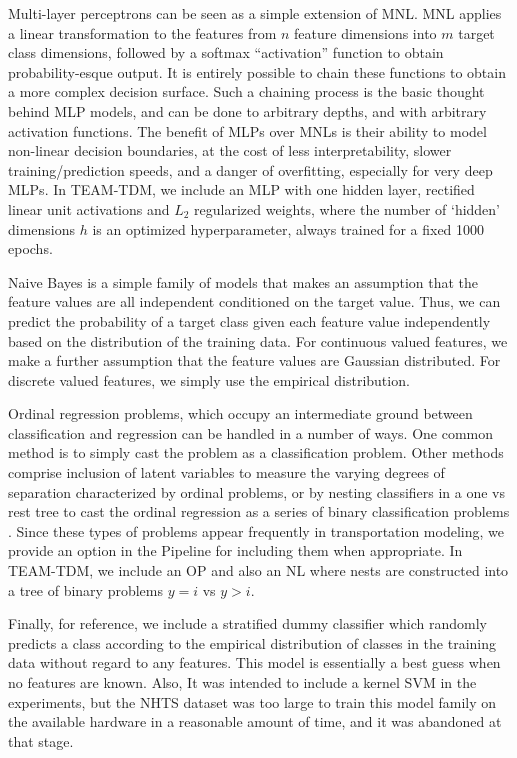 \documentclass[numbered]{trbunofficial}
\begin{document}
Multi-layer perceptrons  can be seen as a simple extension of MNL.
 MNL applies a linear transformation to the features from $n$ feature dimensions into $m$ target class dimensions, followed by a softmax ``activation'' function to obtain probability-esque output.
 It is entirely possible to chain these functions to obtain a more complex decision surface.
 Such a chaining process is the basic thought behind MLP models, and can be done to arbitrary depths, and with arbitrary activation functions.
 The benefit of MLPs over MNLs is their ability to model non-linear decision boundaries, at the cost of less interpretability, slower training/prediction speeds, and a danger of overfitting, especially for very deep MLPs.
 In TEAM-TDM, we include an MLP with one hidden layer, rectified linear unit activations and $L_2$ regularized weights, where the number of `hidden' dimensions $h$ is an optimized hyperparameter, always trained for a fixed 1000 epochs.

Naive Bayes is a simple family of models that makes an assumption that the feature values are all independent conditioned on the target value.
 Thus, we can predict the probability of a target class given each feature value independently based on the distribution of the training data.
 For continuous valued features, we make a further assumption that the feature values are Gaussian distributed.
 For discrete valued features, we simply use the empirical distribution.

Ordinal regression problems, which occupy an intermediate ground between classification and regression can be handled in a number of ways.
 One common method is to simply cast the problem as a classification problem.
 Other methods comprise inclusion of latent variables to measure the varying degrees of separation characterized by ordinal problems, or by nesting classifiers in a one vs rest tree to cast the ordinal regression as a series of binary classification problems .
 Since these types of problems appear frequently in transportation modeling, we provide an option in the Pipeline for including them when appropriate.
 In TEAM-TDM, we include an OP and also an NL where nests are constructed into a tree of binary problems $y = i$ vs $y > i$.

Finally, for reference, we include a stratified dummy classifier which randomly predicts a class according to the empirical distribution of classes in the training data without regard to any features.
 This model is essentially a best guess when no features are known.
 Also, It was intended to include a kernel SVM in the experiments, but the NHTS dataset was too large to train this model family on the available hardware in a reasonable amount of time, and it was abandoned at that stage.
\end{document}
